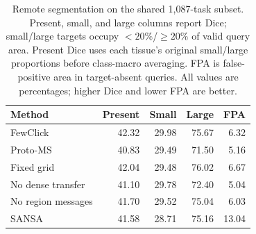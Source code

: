 \begin{table}[t]
\centering
\caption{Remote segmentation on the shared 1,087-task subset. Present, small, and large columns report Dice; small/large targets occupy $<20\%$/$\geq20\%$ of valid query area. Present Dice uses each tissue's original small/large proportions before class-macro averaging. FPA is false-positive area in target-absent queries. All values are percentages; higher Dice and lower FPA are better.}
\label{tab:sampled_controls}
\small\setlength{\tabcolsep}{3pt}
\begin{tabular}{@{}lrrrr@{}}
\toprule
Method & Present & Small & Large & FPA \\
\midrule
FewClick & 42.32 & 29.98 & 75.67 & 6.32 \\
Proto-MS & 40.83 & 29.49 & 71.50 & 5.16 \\
Fixed grid & 42.04 & 29.48 & 76.02 & 6.67 \\
No dense transfer & 41.10 & 29.78 & 72.40 & 5.04 \\
No region messages & 41.70 & 29.52 & 75.04 & 6.03 \\
SANSA & 41.58 & 28.71 & 75.16 & 13.04 \\
\bottomrule
\end{tabular}
\end{table}
